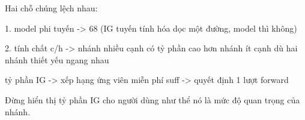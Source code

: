 \documentclass[11pt,a4paper]{article}
\begin{document}
Hai chỗ chúng lệch nhau:

\begin{dia}
1. model phi tuyến   -> 68%
                        (IG tuyến tính hóa dọc một đường, model thì không)

2. tính chất c/h     -> nhánh nhiều cạnh có tỷ phần cao hơn nhánh ít cạnh
                        dù hai nhánh thiết yếu ngang nhau
\end{dia}

\begin{dia}
tỷ phần IG  ->  xếp hạng ứng viên     miễn phí
suff        ->  quyết định            1 lượt forward
\end{dia}

Đừng hiển thị tỷ phần IG cho người dùng như thể nó là mức độ quan trọng của nhánh.
\end{document}

